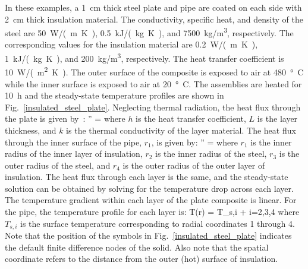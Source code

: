 \documentclass[11pt]{book}
\begin{document}
In these examples, a 1~cm thick steel plate and pipe are coated on each side with 2~cm thick insulation material. The conductivity, specific heat, and density of the steel are 50~\si{W/(m.K)}, 0.5~\si{kJ/(kg.K)}, and 7500~\si{kg/m^3}, respectively. The corresponding values for the insulation material are 0.2~\si{W/(m.K)}, 1~\si{kJ/(kg.K)}, and 200~\si{kg/m^3}, respectively. The heat transfer coefficient is 10~\si{W/(m^2.K)}. The outer surface of the composite is exposed to air at 480~\si{\degree C} while the inner surface is exposed to air at 20~\si{\degree C}. The assemblies are heated for 10~h and the steady-state temperature profiles are shown in Fig.~\ref{insulated_steel_plate}. Neglecting thermal radiation, the heat flux through the plate is given by~\cite{Incropera:1}:
\be
   '' = 
\ee
where $h$ is the heat transfer coefficient, $L$ is the layer thickness, and $k$ is the thermal conductivity of the layer material. The heat flux through the inner surface of the pipe, $r_1$, is given by:
\be
   '' = 
\ee
where $r_1$ is the inner radius of the inner layer of insulation, $r_2$ is the inner radius of the steel, $r_3$ is the outer radius of the steel, and $r_4$ is the outer radius of the outer layer of insulation. The heat flux through each layer is the same, and the steady-state solution can be obtained by solving for the temperature drop across each layer. The temperature gradient within each layer of the plate composite is linear. For the pipe, the temperature profile for each layer is:
\be
   T(r) = T_{s,i} +  \ln {} \quad \quad i=2,3,4
\ee
where $T_{s,i}$ is the surface temperature corresponding to radial coordinates 1 through 4. Note that the position of the symbols in Fig.~\ref{insulated_steel_plate} indicates the default finite difference nodes of the solid. Also note that the spatial coordinate refers to the distance from the outer (hot) surface of insulation.
\end{document}
